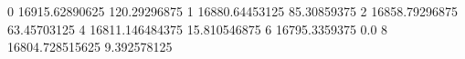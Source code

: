 0 16915.62890625 120.29296875
1 16880.64453125 85.30859375
2 16858.79296875 63.45703125
4 16811.146484375 15.810546875
6 16795.3359375 0.0
8 16804.728515625 9.392578125
